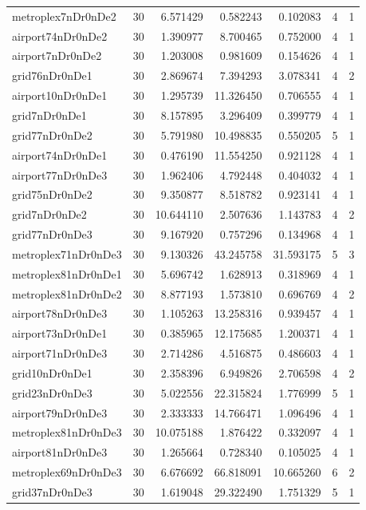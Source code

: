 \documentclass[../../../thesis.tex]{subfiles}
\begin{document}
\begin{longtable}{|l|r|r|r|r|r|r|}
metroplex7nDr0nDe2 & 30 & 6.571429 & 0.582243 & 0.102083 & 4 & 1 \\
airport74nDr0nDe2 & 30 & 1.390977 & 8.700465 & 0.752000 & 4 & 1 \\
airport7nDr0nDe2 & 30 & 1.203008 & 0.981609 & 0.154626 & 4 & 1 \\
grid76nDr0nDe1 & 30 & 2.869674 & 7.394293 & 3.078341 & 4 & 2 \\
airport10nDr0nDe1 & 30 & 1.295739 & 11.326450 & 0.706555 & 4 & 1 \\
grid7nDr0nDe1 & 30 & 8.157895 & 3.296409 & 0.399779 & 4 & 1 \\
grid77nDr0nDe2 & 30 & 5.791980 & 10.498835 & 0.550205 & 5 & 1 \\
airport74nDr0nDe1 & 30 & 0.476190 & 11.554250 & 0.921128 & 4 & 1 \\
airport77nDr0nDe3 & 30 & 1.962406 & 4.792448 & 0.404032 & 4 & 1 \\
grid75nDr0nDe2 & 30 & 9.350877 & 8.518782 & 0.923141 & 4 & 1 \\
grid7nDr0nDe2 & 30 & 10.644110 & 2.507636 & 1.143783 & 4 & 2 \\
grid77nDr0nDe3 & 30 & 9.167920 & 0.757296 & 0.134968 & 4 & 1 \\
metroplex71nDr0nDe3 & 30 & 9.130326 & 43.245758 & 31.593175 & 5 & 3 \\
metroplex81nDr0nDe1 & 30 & 5.696742 & 1.628913 & 0.318969 & 4 & 1 \\
metroplex81nDr0nDe2 & 30 & 8.877193 & 1.573810 & 0.696769 & 4 & 2 \\
airport78nDr0nDe3 & 30 & 1.105263 & 13.258316 & 0.939457 & 4 & 1 \\
airport73nDr0nDe1 & 30 & 0.385965 & 12.175685 & 1.200371 & 4 & 1 \\
airport71nDr0nDe3 & 30 & 2.714286 & 4.516875 & 0.486603 & 4 & 1 \\
grid10nDr0nDe1 & 30 & 2.358396 & 6.949826 & 2.706598 & 4 & 2 \\
grid23nDr0nDe3 & 30 & 5.022556 & 22.315824 & 1.776999 & 5 & 1 \\
airport79nDr0nDe3 & 30 & 2.333333 & 14.766471 & 1.096496 & 4 & 1 \\
metroplex81nDr0nDe3 & 30 & 10.075188 & 1.876422 & 0.332097 & 4 & 1 \\
airport81nDr0nDe3 & 30 & 1.265664 & 0.728340 & 0.105025 & 4 & 1 \\
metroplex69nDr0nDe3 & 30 & 6.676692 & 66.818091 & 10.665260 & 6 & 2 \\
grid37nDr0nDe3 & 30 & 1.619048 & 29.322490 & 1.751329 & 5 & 1 \\

\end{longtable}
\end{document}
